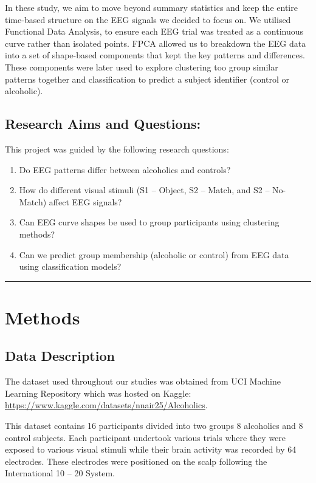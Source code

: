 \documentclass{article}
\begin{document}
In these study, we aim to move beyond summary statistics and keep the
entire time-based structure on the EEG signals we decided to focus on.
We utilised Functional Data Analysis, to ensure each EEG trial was
treated as a continuous curve rather than isolated points. FPCA allowed
us to breakdown the EEG data into a set of shape-based components that
kept the key patterns and differences. These components were later used
to explore clustering too group similar patterns together and
classification to predict a subject identifier (control or alcoholic).

\subsection{Research Aims and
Questions:}\label{research-aims-and-questions}

This project was guided by the following research questions:

\begin{enumerate}
\def\labelenumi{\arabic{enumi}.}
\item
  Do EEG patterns differ between alcoholics and controls?
\item
  How do different visual stimuli (S1 -- Object, S2 -- Match, and S2 --
  No-Match) affect EEG signals?
\item
  Can EEG curve shapes be used to group participants using clustering
  methods?
\item
  Can we predict group membership (alcoholic or control) from EEG data
  using classification models?
\end{enumerate}

\begin{center}\rule{0.5\linewidth}{0.5pt}\end{center}

\section{Methods}\label{methods-1}

\subsection{Data Description}\label{data-description}

The dataset used throughout our studies was obtained from UCI Machine
Learning Repository which was hosted on Kaggle:
\url{https://www.kaggle.com/datasets/nnair25/Alcoholics}.

This dataset contains 16 participants divided into two groups 8
alcoholics and 8 control subjects. Each participant undertook various
trials where they were exposed to various visual stimuli while their
brain activity was recorded by 64 electrodes. These electrodes were
positioned on the scalp following the International 10 -- 20 System.
\end{document}
